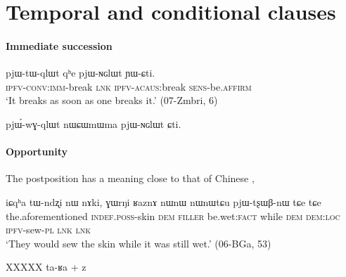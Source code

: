 \chapter{Temporal and conditional clauses} \label{chap:temporal.conditional}

\subsubsection{Immediate succession}
\begin{exe}
\ex \label{ex:pjWtWqlWt} 
\gll pjɯ-tɯ-qlɯt qʰe pjɯ-ɴɢlɯt ɲɯ-ɕti. \\
\textsc{ipfv-conv:imm}-break \textsc{lnk} \textsc{ipfv}-\textsc{acaus}:break \textsc{sens}-be.\textsc{affirm} \\
\glt `It breaks as soon as one breaks it.' (07-Zmbri, 6)
\end{exe}
pjɯ́-wɣ-qlɯt nɯɕɯmɯma pjɯ-ɴɢlɯt ɕti.
\subsubsection{Opportunity}
The postposition  has a meaning close to that of Chinese , 

\begin{exe}
\ex \label{ex:GWrNi.RaznA}
\gll iɕqʰa tɯ-ndʐi nɯ nɤki, ɣɯrŋi ʁaznɤ nɯnɯ nɯnɯtɕu pjɯ-tʂɯβ-nɯ tɕe tɕe \\
the.aforementioned \textsc{indef}.\textsc{poss}-skin \textsc{dem} \textsc{filler} be.wet:\textsc{fact} while \textsc{dem} \textsc{dem}:\textsc{loc} \textsc{ipfv}-sew-\textsc{pl} \textsc{lnk} \textsc{lnk} \\
\glt `They would sew the skin while it was still wet.' (06-BGa, 53)
\end{exe}
XXXXX ta-ʁa + z
